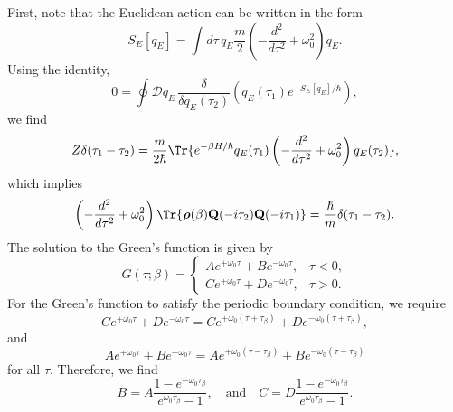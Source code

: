 \begin{enumerate}[label=\alph*)]
\begin{solution}
            First, note that the Euclidean action can be written in the form
            \begin{equation}
                S_E[q_E]  = \int d\tau \,q_E\frac{m}{2}\left(-\frac{d^2}{d\tau^2}+\omega_0^2\right)q_E.
            \end{equation}
            Using the identity, 
            \begin{equation}
                0= \oint\mathcal{D}q_E\,\frac{\delta}{\delta q_E(\tau_2)}\left(q_E(\tau_1)e^{-S_E[q_E]/\hbar    }\right),
            \end{equation}
            we find
            \begin{equation}
                Z\delta(\tau_1-\tau_2) = \frac{m}{2\hbar}\Tr{e^{-\beta H/\hbar  } q_E(\tau_1)\left(-\frac{d^2}{d\tau^2}+\omega_0^2\right)q_E(\tau_2)},
            \end{equation}
            which implies
            \begin{equation}
                \left(-\frac{d^2}{d\tau^2}+\omega_0^2\right)\Tr{\boldsymbol{\rho}(\beta)\mathbf{Q}(-i\tau_2)\mathbf{Q}(-i\tau_1)} = \frac{\hbar}{m}\delta(\tau_1-\tau_2).
            \end{equation}
            The solution to the Green's function is given by 
            \begin{equation}
                G(\tau;\beta) = \begin{cases}
                    Ae^{+\omega_0\tau} + Be^{-\omega_0\tau}, &\tau<0,\\
                    Ce^{+\omega_0\tau} + De^{-\omega_0\tau}, &\tau>0.
                \end{cases}
            \end{equation}
            For the Green's function to satisfy the periodic boundary condition, we require
            \begin{equation}
                Ce^{+\omega_0\tau} + De^{-\omega_0\tau}  = Ce^{+\omega_0(\tau+\tau_\beta)} + De^{-\omega_0(\tau+\tau_\beta)},
            \end{equation}
            and
            \begin{equation}
                Ae^{+\omega_0\tau} + Be^{-\omega_0\tau}  = Ae^{+\omega_0(\tau-\tau_\beta)} + Be^{-\omega_0(\tau-\tau_\beta)}
            \end{equation}
            for all $\tau$. Therefore, we find
            \begin{equation}
                B = A \frac{1-e^{-\omega_0\tau_\beta}}{e^{\omega_0\tau_\beta}-1}, \quad \text{and} \quad C = D \frac{1-e^{-\omega_0\tau_\beta}}{e^{\omega_0\tau_\beta}-1}.

\end{equation}
\end{solution}
\end{enumerate}
